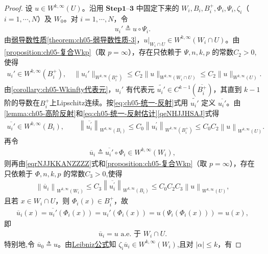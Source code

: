 \documentclass[../../main.tex]{subfiles}
\begin{document}
\begin{proof}
设 $u\in W^{k,\infty}(U)$。沿用 $\mathbf{Step}\bm{1}$--$\mathbf{3}$ 中固定下来的 $W_i,B_i,B_i^{+},\Phi_i,\Psi_i,\zeta_i$（$i=1,\cdots,N$）及 $W_0$。对 $i=1,\cdots,N$，令
\begin{align*}
u_i'\triangleq u\circ\Psi_i.
\end{align*}
由\hyperref[theorem:ch05-弱导数性质]{弱导数性质\ref{theorem:ch05-弱导数性质-3}}，$u|_{W_i\cap U}\in W^{k,\infty}(W_i\cap U)$。由\cref{proposition:ch05-复合Wkp}（取 $p=\infty$），存在只依赖于 $\Psi,n,k,p$ 的常数$C_2>0$,使得
\begin{align}\label{qeNHJJHSAJ}
u_i'\in W^{k,\infty}(B_i^{+}),\quad
\|u_i'\|_{W^{k,\infty}(B_i^{+})}\leqslant C_2\|u\|_{W^{k,\infty}(W_i\cap U)}\leqslant C_2\|u\|_{W^{k,\infty}(U)}.
\end{align}
由\cref{corollary:ch05-Wkinfty代表元}，$u_i'$ 有代表元 $\widetilde{u_i'}\in C^{k-1}(\overline{B_i^{+}})$，其直到 $k-1$ 阶的导数在$B_i^+$上Lipschitz连续。按\eqref{eq:ch05-统一-反射}式用 $\widetilde{u_i'}$ 定义 $\overline{u_i'}$。由\cref{lemma:ch05-高阶反射}和\eqref{eq:ch05-统一-反射估计}\eqref{qeNHJJHSAJ}式得
\begin{align}\label{eqrNJJKKANZZZZ}
\overline{u_i'}\in W^{k,\infty}(B_i),\qquad
\left\| \overline{u_{i}^{\prime}} \right\| _{W^{k,\infty}\left( B_i \right)}\leqslant C_0\left\| u_{i}^{\prime} \right\| _{W^{k,\infty}(B_{i}^{+})}\leqslant C_0C_2\left\| u \right\| _{W^{k,\infty}\left( U \right)}.
\end{align}
再令
\begin{align*}
\overline{u}_i\triangleq\overline{u_i'}\circ\Phi_i\in W^{k,\infty}(W_i),
\end{align*}
则再由\eqref{eqrNJJKKANZZZZ}式和\cref{proposition:ch05-复合Wkp}（取 $p=\infty$），存在只依赖于 $\Phi,n,k,p$ 的常数$C_3>0$,使得
\begin{align}
\left\| \overline{u}_i \right\| _{W^{k,\infty}\left( W_i \right)}\leqslant C_3\left\| \overline{u_{i}^{\prime}} \right\| _{W^{k,\infty}\left( B_i \right)}\leqslant C_0C_2C_3\left\| u \right\| _{W^{k,\infty}\left( U \right)},\label{eqnjkNJNS}
\end{align}
且若 $x\in W_i\cap U$，则 $\Phi_i(x)\in B_i^{+}$，故
\begin{align*}
\overline{u}_i(x)=\overline{u_i'}(\Phi_i(x))=u_i'(\Phi_i(x))=u(\Psi_i(\Phi_i(x)))=u(x),
\end{align*}
即
\begin{align*}
\overline{u}_i=u \,\,\text{a.e.} \,\,\text{于}\,\, W_i\cap U.
\end{align*}
特别地,令 $\overline{u}_0\triangleq u$。由\hyperref[theorem:ch05-弱导数性质]{Leibniz公式}知 $\zeta_i\overline{u}_i\in W^{k,\infty}(W_i)$,且对 $|\alpha|\leqslant k$，有

\end{proof}
\end{document}
